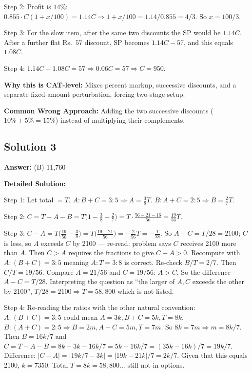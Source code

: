 \documentclass[11pt]{article}
\begin{document}
Step 2: Profit is \(14\%\): \(0.855 \cdot C(1+x/100) = 1.14 C \Rightarrow 1+x/100 = 1.14/0.855 = 4/3\). So \(x = 100/3\).

Step 3: For the slow item, after the same two discounts the SP would be \(1.14 C\). After a further flat Rs.~\(57\) discount, SP becomes \(1.14C - 57\), and this equals \(1.08 C\). 

Step 4: \(1.14C - 1.08C = 57 \Rightarrow 0.06C = 57 \Rightarrow C = 950\).

\textbf{Why this is CAT-level:} Mixes percent markup, successive discounts, and a separate fixed-amount perturbation, forcing two-stage setup.

\textbf{Common Wrong Approach:} Adding the two successive discounts (\(10\%+5\%=15\%\)) instead of multiplying their complements.

\subsection*{Solution 3}
\textbf{Answer:} (B) 11{,}760

\textbf{Detailed Solution:}

Step 1: Let total \(=T\). \(A : B+C = 3:5 \Rightarrow A = \tfrac{3}{8}T\). \(B : A+C = 2:5 \Rightarrow B = \tfrac{2}{7}T\).

Step 2: \(C = T - A - B = T\bigl(1 - \tfrac{3}{8} - \tfrac{2}{7}\bigr) = T \cdot \tfrac{56 - 21 - 16}{56} = \tfrac{19}{56}T\).

Step 3: \(C - A = T\bigl(\tfrac{19}{56} - \tfrac{3}{8}\bigr) = T\bigl(\tfrac{19 - 21}{56}\bigr) = -\tfrac{2}{56}T = -\tfrac{T}{28}\). So \(A - C = T/28 = 2100\); \(C\) is less, so \(A\) exceeds \(C\) by 2100 — re-read: problem says \(C\) receives 2100 more than \(A\). Then \(C > A\) requires the fractions to give \(C - A > 0\). Recompute with \(A : (B+C) = 3:5\) meaning \(A : T = 3:8\) is correct. Re-check \(B/T = 2/7\). Then \(C/T = 19/56\). Compare \(A=21/56\) and \(C=19/56\): \(A > C\). So the difference \(A - C = T/28\). Interpreting the question as ``the larger of \(A,C\) exceeds the other by 2100'', \(T/28 = 2100 \Rightarrow T = 58{,}800\) which is not listed.

Step 4: Re-reading the ratios with the other natural convention: \(A : (B+C) = 3:5\) could mean \(A = 3k, B+C = 5k, T = 8k\). \(B : (A+C) = 2:5 \Rightarrow B = 2m, A+C=5m, T = 7m\). So \(8k = 7m \Rightarrow m = 8k/7\). Then \(B = 16k/7\) and \(C = T - A - B = 8k - 3k - 16k/7 = 5k - 16k/7 = (35k-16k)/7 = 19k/7\). Difference: \(|C - A| = |19k/7 - 3k| = |19k - 21k|/7 = 2k/7\). Given that this equals 2100, \(k = 7350\). Total \(T = 8k = 58{,}800\)... still not in options. 
\end{document}
